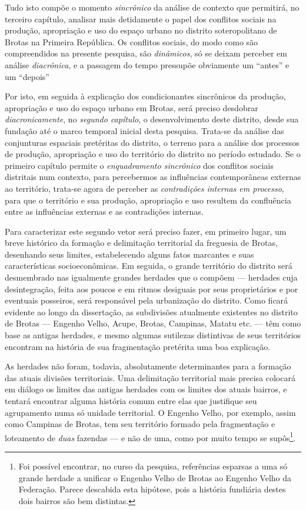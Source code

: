 Tudo isto compõe o momento \textit{sincrônico} da análise de contexto que permitirá, no terceiro capítulo, analisar mais detidamente o papel dos conflitos sociais na produção, apropriação e uso do espaço urbano no distrito soteropolitano de Brotas na Primeira República. Os conflitos sociais, do modo como são compreendidos na presente pesquisa, são \textit{dinâmicos}, só se deixam perceber em análise \textit{diacrônica}, e a passagem do tempo pressupõe obviamente um ``antes'' e um ``depois''

Por isto, em seguida à explicação dos condicionantes sincrônicos da produção, apropriação e uso do espaço urbano em Brotas, será preciso desdobrar \textit{diacronicamente}, no \textit{segundo capítulo}, o desenvolvimento deste distrito, desde sua fundação até o marco temporal inicial desta pesquisa. Trata-se da análise das conjunturas espaciais pretéritas do distrito, o terreno para a análise dos processos de produção, apropriação e uso do território do distrito no período estudado. Se o primeiro capítulo permite o \textit{enquadramento sincrônico} dos conflitos sociais distritais num contexto, para percebermos as influências contemporâneas externas ao território, trata-se agora de perceber as \textit{contradições internas em processo}, para que o território e sua produção, apropriação e uso resultem da confluência entre as influências externas e as contradições internas. 

Para caracterizar este segundo vetor será preciso fazer, em primeiro lugar, um breve histórico da formação e delimitação territorial da freguesia de Brotas, desenhando seus limites, estabelecendo alguns fatos marcantes e suas características socioeconômicas. Em seguida, o grande território do distrito será desmembrado nas igualmente grandes herdades que o compõem --- herdades cuja desintegração, feita aos poucos e em ritmos desiguais por seus proprietários e por eventuais posseiros, será responsável pela urbanização do distrito. Como ficará evidente ao longo da dissertação, as subdivisões atualmente existentes no distrito de Brotas --- Engenho Velho, Acupe, Brotas, Campinas, Matatu etc. --- têm como base as antigas herdades, e mesmo algumas sutilezas distintivas de seus territórios encontram na história de sua fragmentação pretérita uma boa explicação.

As herdades não foram, todavia, absolutamente determinantes para a formação das atuais divisões territoriais. Uma delimitação territorial mais precisa colocará em diálogo os limites das antigas herdades com os limites dos atuais bairros, e tentará encontrar alguma história comum entre elas que justifique seu agrupamento numa só unidade territorial. O Engenho Velho, por exemplo, assim como Campinas de Brotas, tem seu território formado pela fragmentação e loteamento de \textit{duas} fazendas --- e não de uma, como por muito tempo se supôs\footnote{Foi possível encontrar, no curso da pesquisa, referências esparsas a uma só grande herdade a unificar o Engenho Velho de Brotas ao Engenho Velho da Federação. Parece descabida esta hipótese, pois a história fundiária destes dois bairros são bem distintas.}. 


